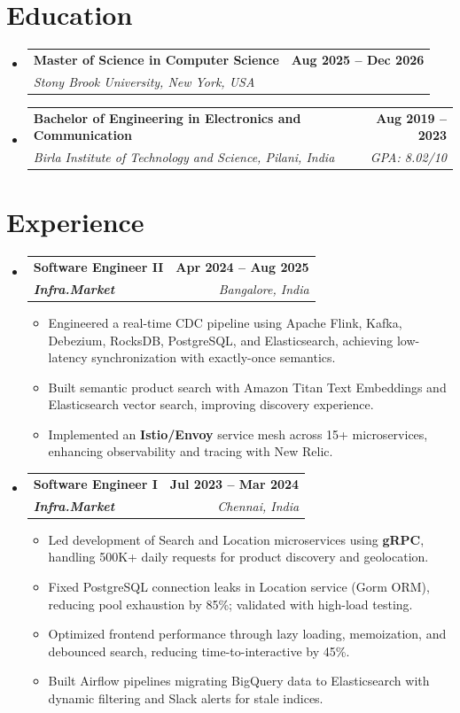 \documentclass[letterpaper,11pt]{article}
\makeatletter
\newcommand{\resumeItem}[1]{
  \item\small{
    {#1 \vspace{-2pt}}
  }
}
\newcommand{\resumeSubheading}[4]{
  \vspace{-2pt}\item
    \begin{tabular*}{1.0\textwidth}[t]{l@{\extracolsep{\fill}}r}
      \textbf{#1} & \textbf{\small #2} \\
      \textit{\small#3} & \textit{\small #4} \\
    \end{tabular*}\vspace{-7pt}
}
\newcommand{\resumeSubHeadingListStart}{\begin{itemize}[leftmargin=0.0in, label={}]}
\newcommand{\resumeSubHeadingListEnd}{\end{itemize}}
\newcommand{\resumeItemListStart}{\begin{itemize}}
\newcommand{\resumeItemListEnd}{\end{itemize}\vspace{-5pt}}
\makeatother
\begin{document}
\section{Education}
  \resumeSubHeadingListStart
    \resumeSubheading
      {Master of Science in Computer Science}{Aug 2025 -- Dec 2026}
      {Stony Brook University, New York, USA}{}
    \resumeSubheading
      {Bachelor of Engineering in Electronics and Communication}{Aug 2019 -- 2023}
      {Birla Institute of Technology and Science, Pilani, India}{GPA: 8.02/10}
  \resumeSubHeadingListEnd
\vspace{-12pt}

\section{Experience}
  \resumeSubHeadingListStart

    \resumeSubheading
      {\textbf{Software Engineer II}}{\textbf{Apr 2024 -- Aug 2025}}
      {\textbf{Infra.Market}}{Bangalore, India}
      \resumeItemListStart
        \resumeItem{Engineered a real-time CDC pipeline using Apache Flink, Kafka, Debezium, RocksDB, PostgreSQL, and Elasticsearch, achieving low-latency synchronization with exactly-once semantics.}
        \resumeItem{Built semantic product search with Amazon Titan Text Embeddings and Elasticsearch vector search, improving discovery experience.}
        \resumeItem{Implemented an \textbf{Istio/Envoy} service mesh across 15+ microservices, enhancing observability and tracing with New Relic.}
      \resumeItemListEnd

    \resumeSubheading
      {\textbf{Software Engineer I}}{\textbf{Jul 2023 -- Mar 2024}}
      {\textbf{Infra.Market}}{Chennai, India}
      \resumeItemListStart
        \resumeItem{Led development of Search and Location microservices using \textbf{gRPC}, handling 500K+ daily requests for product discovery and geolocation.}
        \resumeItem{Fixed PostgreSQL connection leaks in Location service (Gorm ORM), reducing pool exhaustion by 85\%; validated with high-load testing.}
        \resumeItem{Optimized frontend performance through lazy loading, memoization, and debounced search, reducing time-to-interactive by 45\%.}
        \resumeItem{Built Airflow pipelines migrating BigQuery data to Elasticsearch with dynamic filtering and Slack alerts for stale indices.}
      \resumeItemListEnd

  \resumeSubHeadingListEnd
\vspace{-12pt}
\end{document}
